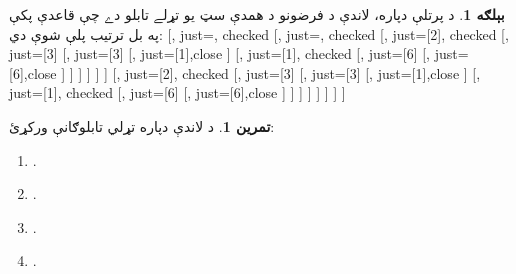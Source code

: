 \documentclass[12pt,a4paper,oneside]{report}
\newenvironment{oltableau}
  {\center\LTR\tableau{}}
  {\endtableau\endLTR\endcenter}
\theoremstyle{definition}
\newtheorem{ex}[thm]{بېلګه}
\newtheorem{prob}[thm]{تمرين}
\begin{document}
\begin{ex}
\label{olpseg:OLP-0103-B014:start}
د پرتلې دپاره، لاندې د فرضونو د همدې سټ يو تړلے تابلو دے
چې قاعدې پکې په بل ترتيب پلې شوې دي:
\begin{oltableau}
  [,
    just=\TAss, checked
    [, just=\TAss, checked
      [,
        just={\TRule{\False}{\land}[2]}, checked
        [,
          just={\TRule{\False}{\lor}[3]}
          [,
            just={\TRule{\False}{\lor}[3]}
            [,
              just={\TRule{\True}{\lor}[1]},close
            ]
            [,
              just={\TRule{\True}{\lor}[1]}, checked
              [,
                just={\TRule{\True}{\land}[6]}
                [,
                  just={\TRule{\True}{\land}[6]},close
                ]
              ]
            ]
          ]
        ]
      ]
      [,
        just={\TRule{\False}{\land}[2]}, checked
        [,
          just={\TRule{\False}{\lor}[3]}
          [,
            just={\TRule{\False}{\lor}[3]}
            [,
              just={\TRule{\True}{\lor}[1]},close
            ]
            [,
              just={\TRule{\True}{\lor}[1]}, checked
              [,
                just={\TRule{\True}{\land}[6]}
                [,
                  just={\TRule{\True}{\land}[6]},close
                ]
              ]
            ]
          ]
        ]
      ]
    ]
  ]
\end{oltableau}
\end{ex}
\label{olpseg:OLP-0103-B014:end}

\label{olpseg:OLP-0103-B015:start}
\begin{prob}
د لاندې دپاره تړلي تابلوګانې ورکړئ:
\begin{enumerate}
\item {}.
\item {}.
\item {}.
\item {}.
\end{enumerate}
\end{prob}
\label{olpseg:OLP-0103-B015:end}
\end{document}
